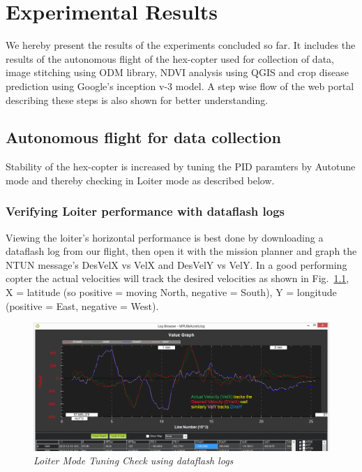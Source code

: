 \chapter{Experimental Results}

We hereby present the results of the experiments concluded so far. It includes the results of the autonomous flight of the hex-copter used for collection of data, image stitching using ODM library, NDVI analysis using QGIS and crop disease prediction using Google's inception v-3 model. A step wise flow of the web portal describing these steps is also shown for better understanding.

\section{Autonomous flight for data collection}

Stability of the hex-copter is increased by tuning the PID paramters by Autotune mode and thereby checking in Loiter mode as described below.

\subsection{Verifying Loiter performance with dataflash logs}
Viewing the loiter’s horizontal performance is best done by downloading a dataflash log from our flight, then open it with the mission planner and graph the NTUN message’s DesVelX vs VelX and DesVelY vs VelY. In a good performing copter the actual velocities will track the desired velocities as shown in Fig.~\ref{fig: Loiter_TuningCheck}, X = latitude (so positive = moving North, negative = South), Y = longitude (positive = East, negative = West).

\begin{figure}[h]
	\includegraphics[width=1.0\linewidth]{Loiter_TuningCheck}
	\centering
	\caption{\label{fig: Loiter_TuningCheck}\textit{Loiter Mode Tuning Check using dataflash logs}}
	\end{figure}

